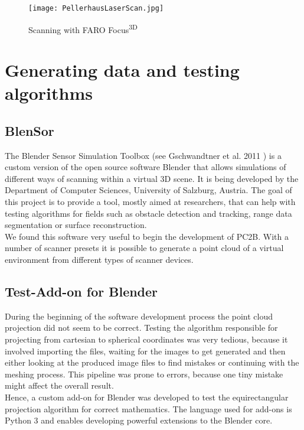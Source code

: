 \begin{figure}[h]
	\centering
	\texttt{[image: PellerhausLaserScan.jpg]}
	\caption{Scanning with FARO Focus\textsuperscript{3D}}
	\label{fig:laser_scanning_on_location}
\end{figure}


\section{Generating data and testing algorithms}

\subsection{BlenSor}

The Blender Sensor Simulation Toolbox (see Gschwandtner et al. 2011 \parencite{Gschwandtner11b}) is a custom version of the open source software Blender that allows simulations of different ways of scanning within a virtual 3D scene. It is being developed by the Department of Computer Sciences, University of Salzburg, Austria. The goal of this project is to provide a tool, mostly aimed at researchers, that can help with testing algorithms for fields such as obstacle detection and tracking, range data segmentation or surface reconstruction.\\
We found this software very useful to begin the development of PC2B. With a number of scanner presets it is possible to generate a point cloud of a virtual environment from different types of scanner devices.

\subsection{Test-Add-on for Blender}

During the beginning of the software development process the point cloud projection did not seem to be correct. Testing the algorithm responsible for projecting from cartesian to spherical coordinates was very tedious, because it involved importing the files, waiting for the images to get generated and then either looking at the produced image files to find mistakes or continuing with the meshing process. This pipeline was prone to errors, because one tiny mistake might affect the overall result.\\
Hence, a custom add-on for Blender was developed to test the equirectangular projection algorithm for correct mathematics. The language used for add-ons is Python 3 and enables developing powerful extensions to the Blender core.

